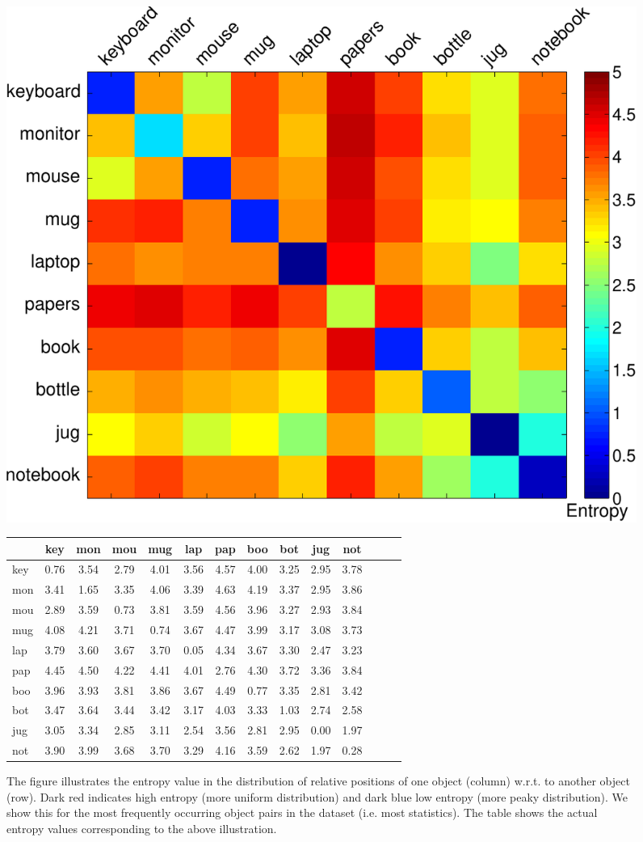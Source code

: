 \documentclass[letterpaper, 10 pt, conference]{ieeeconf}  %
\begin{document}
\begin{figure}
\begin{center}
\includegraphics[width=0.5\linewidth]{entropy_matrix-crop} \bigbreak
\begin{tabular}{|l||c|c|c|c|c|c|c|c|c|c|c|c|c|}
\hline
& key & mon & mou & mug & lap & pap & boo & bot & jug & not \\ \hline \hline
key & 0.76 & 3.54 & 2.79 & 4.01 & 3.56 & 4.57 & 4.00 & 3.25 & 2.95 & 3.78\\ \hline
mon & 3.41 & 1.65 & 3.35 & 4.06 & 3.39 & 4.63 & 4.19 & 3.37 & 2.95 & 3.86\\ \hline
mou & 2.89 & 3.59 & 0.73 & 3.81 & 3.59 & 4.56 & 3.96 & 3.27 & 2.93 & 3.84 \\ \hline
mug & 4.08 & 4.21 & 3.71 & 0.74 & 3.67 & 4.47 & 3.99 & 3.17 & 3.08 & 3.73 \\ \hline
lap & 3.79 & 3.60 & 3.67 & 3.70 & 0.05 & 4.34 & 3.67 & 3.30 & 2.47 & 3.23 \\ \hline
pap & 4.45 & 4.50 & 4.22 & 4.41 & 4.01 & 2.76 & 4.30 & 3.72 & 3.36 & 3.84 \\ \hline
boo & 3.96 & 3.93 & 3.81 & 3.86 & 3.67 & 4.49 & 0.77 & 3.35 & 2.81 & 3.42 \\ \hline
bot & 3.47 & 3.64 & 3.44 & 3.42 & 3.17 & 4.03 & 3.33 & 1.03 & 2.74 & 2.58 \\ \hline
jug & 3.05 & 3.34 & 2.85 & 3.11 & 2.54 & 3.56 & 2.81 & 2.95 & 0.00 & 1.97 \\ \hline
not & 3.90 & 3.99 & 3.68 & 3.70 & 3.29 & 4.16 & 3.59 & 2.62 & 1.97 & 0.28 \\ \hline
\end{tabular}\bigbreak
\caption{The figure illustrates the entropy value in the distribution of relative positions of one object (column) w.r.t. to another object (row). Dark red indicates high entropy (more uniform distribution) and dark blue low entropy (more peaky distribution). We show this for the most frequently occurring object pairs in the dataset (i.e. most statistics). The table shows the actual entropy values corresponding to the above illustration.}
\label{fig:entropy}
\end{center}
\end{figure}
\end{document}
